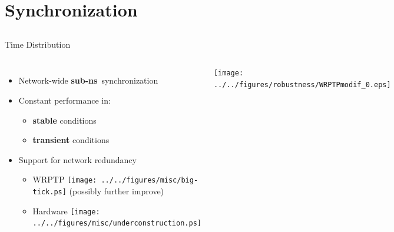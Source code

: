 \documentclass[compress,red]{beamer}
\begin{document}
\section{Synchronization}
\subsection{}
\begin{frame}{Time Distribution}

  \begin{columns}[c]

  \begin{itemize}
    \item Network-wide {\bf sub-ns}~synchronization
    \vspace{0.3cm}
    \item Constant performance in:
	\begin{itemize}
	  \item {\bf stable} conditions
	  \item {\bf transient} conditions
	\end{itemize}
    \vspace{0.3cm}
    \item Support for network redundancy
    \begin{itemize}
      \item WRPTP \texttt{[image: ../../figures/misc/big-tick.ps]}  (possibly further improve)
      \item Hardware \texttt{[image: ../../figures/misc/underconstruction.ps]}
    \end{itemize}
  \end{itemize}


      \begin{center}
	\texttt{[image: ../../figures/robustness/WRPTPmodif\_0.eps]}
      \end{center}  
    

  \end{columns}

\end{frame}
\end{document}
